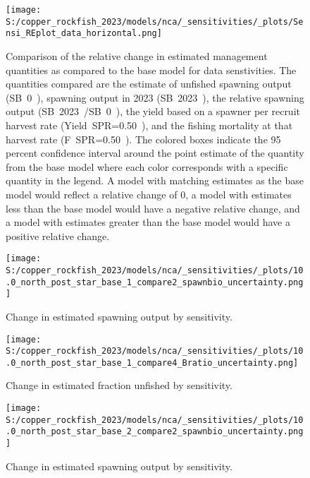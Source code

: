 \documentclass[11pt,
  letterpaper,
]{article}
\begin{document}
\begin{figure}
{\centering
\texttt{[image: S:/copper\_rockfish\_2023/models/nca/\_sensitivities/\_plots/Sensi\_REplot\_data\_horizontal.png]}
}
\caption{Comparison of the relative change in estimated management quantities as compared to the 
base model for data senstivities. The quantities compared are the estimate of unfished spawning 
output (SB~0~), spawning output in 2023 (SB~2023~), the relative spawning output (SB~2023~/SB~0~), 
the yield based on a spawner per recruit harvest rate (Yield~SPR=0.50~), and the fishing mortality at that harvest rate (F~SPR=0.50~). The colored boxes indicate the 95 percent confidence interval around the point estimate of the quantity from the base model where each color corresponds with a specific quantity in the legend. A model with matching estimates as the base model would reflect a relative change of 0, a model with estimates less than the base model would have a negative relative change, and a model with estimates greater than the base model would have a positive relative change.\label{fig:sens-data}}
\end{figure}

\newpage

\begin{figure}
{\centering
\texttt{[image: S:/copper\_rockfish\_2023/models/nca/\_sensitivities/\_plots/10.0\_north\_post\_star\_base\_1\_compare2\_spawnbio\_uncertainty.png]}
}
\caption{Change in estimated spawning output by sensitivity.\label{fig:sens-ssb-1}}
\end{figure}

\newpage

\begin{figure}
{\centering
\texttt{[image: S:/copper\_rockfish\_2023/models/nca/\_sensitivities/\_plots/10.0\_north\_post\_star\_base\_1\_compare4\_Bratio\_uncertainty.png]}
}
\caption{Change in estimated fraction unfished by sensitivity.\label{fig:sens-depl-1}}
\end{figure}

\newpage

\begin{figure}
{\centering
\texttt{[image: S:/copper\_rockfish\_2023/models/nca/\_sensitivities/\_plots/10.0\_north\_post\_star\_base\_2\_compare2\_spawnbio\_uncertainty.png]}
}
\caption{Change in estimated spawning output by sensitivity.\label{fig:sens-ssb-2}}
\end{figure}
\end{document}
